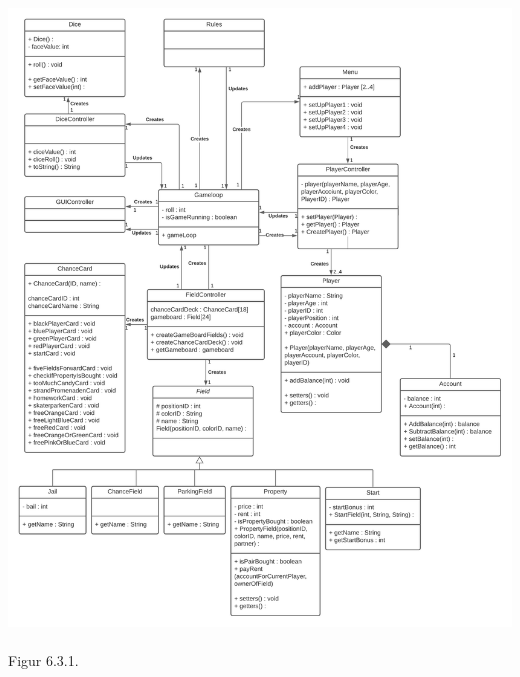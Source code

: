 \begin{flushleft}
\includegraphics[width=1\textwidth]{Report/figures/Class Diagram.png}~\\[1cm]
Figur 6.3.1.

\end{flushleft}